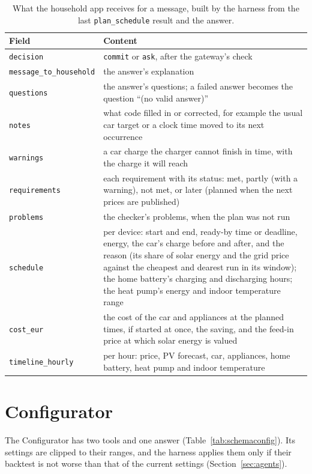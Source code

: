 \documentclass[12pt,a4paper]{report}
\begin{document}
\begin{table}[htbp]
\caption{What the household app receives for a message, built by the
harness from the last \texttt{plan\_schedule} result and the answer.}
\label{tab:schemaapp}
\small
\begin{tabularx}{\textwidth}{@{}>{\raggedright\arraybackslash}p{3.3cm}X@{}}
\toprule
Field & Content \\
\midrule
\texttt{decision} & \texttt{commit} or \texttt{ask}, after the gateway's check \\
\texttt{message\_to\_\allowbreak household} & the answer's explanation \\
\texttt{questions} & the answer's questions; a failed answer becomes the question ``(no valid answer)'' \\
\texttt{notes} & what code filled in or corrected, for example the usual car target or a clock time moved to its next occurrence \\
\texttt{warnings} & a car charge the charger cannot finish in time, with the charge it will reach \\
\texttt{requirements} & each requirement with its status: met, partly (with a warning), not met, or later (planned when the next prices are published) \\
\texttt{problems} & the checker's problems, when the plan was not run \\
\texttt{schedule} & per device: start and end, ready-by time or deadline, energy, the car's charge before and after, and the reason (its share of solar energy and the grid price against the cheapest and dearest run in its window); the home battery's charging and discharging hours; the heat pump's energy and indoor temperature range \\
\texttt{cost\_eur} & the cost of the car and appliances at the planned times, if started at once, the saving, and the feed-in price at which solar energy is valued \\
\texttt{timeline\_hourly} & per hour: price, PV forecast, car, appliances, home battery, heat pump and indoor temperature \\
\bottomrule
\end{tabularx}
\end{table}

\section{Configurator}

The Configurator has two tools and one answer
(Table~\ref{tab:schemaconfig}). Its settings are clipped to their
ranges, and the harness applies them only if their backtest is not
worse than that of the current settings (Section~\ref{sec:agents}).
\end{document}
